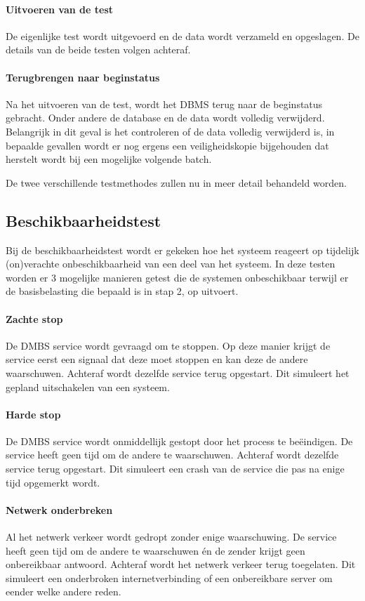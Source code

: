 \paragraph{Uitvoeren van de test} De eigenlijke test wordt uitgevoerd en de data wordt verzameld en opgeslagen. De details van de beide testen volgen achteraf. 

\paragraph{Terugbrengen naar beginstatus} Na het uitvoeren van de test, wordt het DBMS terug naar de beginstatus gebracht. Onder andere de database en de data wordt volledig verwijderd. Belangrijk in dit geval is het controleren of de data volledig verwijderd is, in bepaalde gevallen wordt er nog ergens een veiligheidskopie bijgehouden dat herstelt wordt bij een mogelijke volgende batch. 

De twee verschillende testmethodes zullen nu in meer detail behandeld worden. 
\subsection{Beschikbaarheidstest}
Bij de beschikbaarheidstest wordt er gekeken hoe het systeem reageert op tijdelijk (on)verachte onbeschikbaarheid van een deel van het systeem. In deze testen worden er 3 mogelijke manieren getest die de systemen onbeschikbaar terwijl er de basisbelasting die bepaald is in stap 2, op uitvoert. 

\paragraph{Zachte stop} De DMBS service wordt gevraagd om te stoppen. Op deze manier krijgt de service eerst een signaal dat deze moet stoppen en kan deze de andere waarschuwen. Achteraf wordt dezelfde service terug opgestart. Dit simuleert het gepland uitschakelen van een systeem. 

\paragraph{Harde stop} De DMBS service wordt onmiddellijk gestopt door het process te beëindigen. De service heeft geen tijd om de andere te waarschuwen. Achteraf wordt dezelfde service terug opgestart. Dit simuleert een crash van de service die pas na enige tijd opgemerkt wordt. 

\paragraph{Netwerk onderbreken} Al het netwerk verkeer wordt gedropt zonder enige waarschuwing. De service heeft geen tijd om de andere te waarschuwen én de zender krijgt geen onbereikbaar antwoord. Achteraf wordt het netwerk verkeer terug toegelaten. Dit simuleert een onderbroken internetverbinding of een onbereikbare server om eender welke andere reden.  

